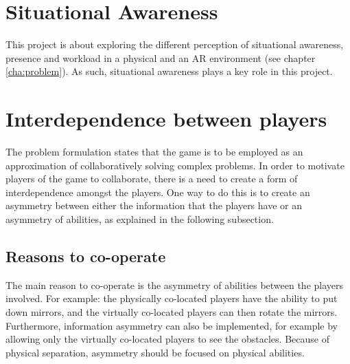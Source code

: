 	
	\section{Situational Awareness} \label{sec:awareness}
		This project is about exploring the different perception of situational 
		awareness, presence and workload in a physical and an AR environment 
		(see chapter \ref{cha:problem}). As such, situational awareness plays a 
		key role in this project.
		
	
	\section{Interdependence between players} \label{sec:interdependence}
		The problem formulation states that the game is to be employed as an 
		approximation of collaboratively solving complex problems. In order to
		motivate players of the game to collaborate, there is a need to create
		a form of interdependence amongst the players. One way to do this is to 
		create an asymmetry between either the information that the players have or
		an asymmetry of abilities, as explained in the following subsection. 
		\subsection{Reasons to co-operate}
			The main reason to co-operate is the asymmetry of abilities between
			the players involved. For example: the physically co-located players
			have the ability to put down mirrors, and the virtually co-located
			players can then rotate the mirrors. Furthermore, information
			asymmetry can also be implemented, for example by allowing only the
			virtually co-located players to see the obstacles. Because of physical
			separation, asymmetry should be focused on physical abilities.
		
